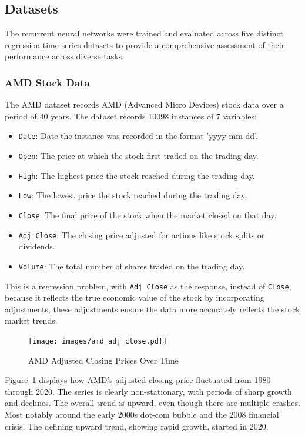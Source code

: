 \documentclass[conference]{IEEEtran}
\begin{document}
\subsection{\textbf{Datasets}}

The recurrent neural networks were trained and evaluated across five distinct regression time series datasets to provide a comprehensive assessment of their performance across diverse tasks.

\subsubsection{\textbf{AMD Stock Data}}

The AMD dataset records AMD (Advanced Micro Devices) stock data over a period of 40 years. The dataset records 10098 instances of 7 variables:

\begin{itemize}
    \item \texttt{Date}: Date the instance was recorded in the format 'yyyy-mm-dd'.
    \item \texttt{Open}: The price at which the stock first traded on the trading day.
    \item \texttt{High}: The highest price the stock reached during the trading day.
    \item \texttt{Low}: The lowest price the stock reached during the trading day.
    \item \texttt{Close}: The final price of the stock when the market closed on that day.
    \item \texttt{Adj Close}: The closing price adjusted for actions like stock splits or dividends.
    \item \texttt{Volume}: The total number of shares traded on the trading day.
\end{itemize}

This is a regression problem, with \texttt{Adj Close} as the response, instead of \texttt{Close}, because it reflects the true economic value of the stock by incorporating adjustments, these adjustments ensure the data more accurately reflects the stock market trends.

\begin{figure}[H]
    \centering
    \texttt{[image: images/amd\_adj\_close.pdf]}
    \caption{AMD Adjusted Closing Prices Over Time}
    \label{fig:amd_adj_close}
\end{figure}

Figure~\ref{fig:amd_adj_close} displays how AMD's adjusted closing price fluctuated from 1980 through 2020. The series is clearly non-stationary, with periods of sharp growth and declines. The overall trend is upward, even though there are multiple crashes. Most notably around the early 2000s dot-com bubble and the 2008 financial crisis. The defining upward trend, showing rapid growth, started in 2020.
\end{document}
